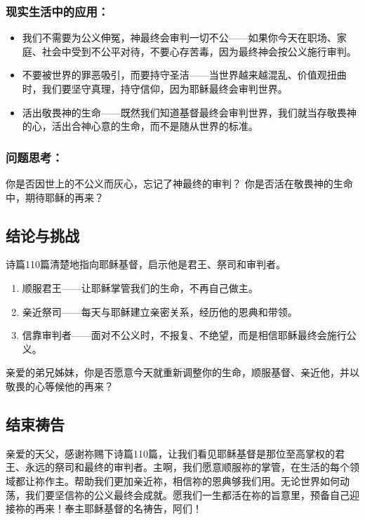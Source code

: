 \documentclass[a4paper, 12pt]{article}
\begin{document}
\subsubsection*{现实生活中的应用：}
\begin{itemize}
    \item 我们不需要为公义伸冤，神最终会审判一切不公——如果你今天在职场、家庭、社会中受到不公平对待，不要心存苦毒，因为最终神会按公义施行审判。

    \item 不要被世界的罪恶吸引，而要持守圣洁——当世界越来越混乱、价值观扭曲时，我们要坚守真理，持守信仰，因为耶稣最终会审判世界。

    \item 活出敬畏神的生命——既然我们知道基督最终会审判世界，我们就当存敬畏神的心，活出合神心意的生命，而不是随从世界的标准。

\end{itemize}
\subsubsection*{问题思考：}

你是否因世上的不公义而灰心，忘记了神最终的审判？
你是否活在敬畏神的生命中，期待耶稣的再来？
\subsection*{结论与挑战}
诗篇110篇清楚地指向耶稣基督，启示他是君王、祭司和审判者。
\begin{enumerate}
    \item 顺服君王——让耶稣掌管我们的生命，不再自己做主。

    \item 亲近祭司——每天与耶稣建立亲密关系，经历他的恩典和带领。

    \item 信靠审判者——面对不公义时，不报复、不绝望，而是相信耶稣最终会施行公义。

\end{enumerate}

亲爱的弟兄姊妹，你是否愿意今天就重新调整你的生命，顺服基督、亲近他，并以敬畏的心等候他的再来？

\subsection*{结束祷告}
亲爱的天父，感谢祢赐下诗篇110篇，让我们看见耶稣基督是那位至高掌权的君王、永远的祭司和最终的审判者。主啊，我们愿意顺服祢的掌管，在生活的每个领域都让祢作主。帮助我们更加亲近祢，相信祢的恩典够我们用。无论世界如何动荡，我们要坚信祢的公义最终会成就。愿我们一生都活在祢的旨意里，预备自己迎接祢的再来！奉主耶稣基督的名祷告，阿们！
\newpage
\end{document}
